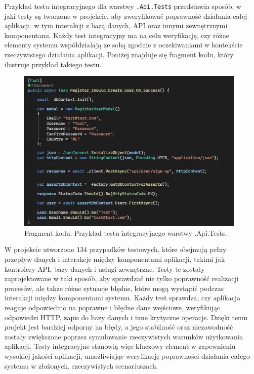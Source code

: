 \documentclass[12pt,a4paper]{article}
\begin{document}
\newpage

\noindent 
Przykład testu integracyjnego dla warstwy \texttt{.Api.Tests} przedstawia sposób, w jaki testy są tworzone w projekcie, aby zweryfikować poprawność działania całej aplikacji, w tym interakcji z bazą danych, API oraz innymi zewnętrznymi komponentami. Każdy test integracyjny ma na celu weryfikację, czy różne elementy systemu współdziałają ze sobą zgodnie z oczekiwaniami w kontekście rzeczywistego działania aplikacji. Poniżej znajduje się fragment kodu, który ilustruje przykład takiego testu.

\vspace{0.5cm}
\begin{figure}[h!]
    \centering
    \includegraphics[width=1\textwidth]{images/ex_api_test.png}
    \caption{Fragment kodu: Przykład testu integracyjnego warstwy .Api.Tests.}
\end{figure}
\vspace{0.5cm}

\noindent
W projekcie utworzono 134 przypadków testowych, które obejmują pełny przepływ danych i interakcje między komponentami aplikacji, takimi jak kontrolery API, bazy danych i usługi zewnętrzne. Testy te zostały zaprojektowane w taki sposób, aby sprawdzać nie tylko poprawność realizacji procesów, ale także różne sytuacje błędne, które mogą wystąpić podczas interakcji między komponentami systemu. Każdy test sprawdza, czy aplikacja reaguje odpowiednio na poprawne i błędne dane wejściowe, weryfikując odpowiedzi HTTP, zapis do bazy danych i inne krytyczne operacje. Dzięki temu projekt jest bardziej odporny na błędy, a jego stabilność oraz niezawodność zostały zwiększone poprzez symulowanie rzeczywistych warunków użytkowania aplikacji. Testy integracyjne stanowią więc kluczowy element w zapewnieniu wysokiej jakości aplikacji, umożliwiając weryfikację poprawności działania całego systemu w złożonych, rzeczywistych scenariuszach.
\end{document}
